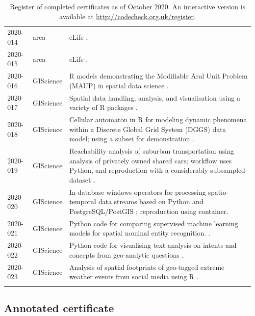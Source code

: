 \documentclass[12pt]{article}
\begin{document}
\begin{table}
\begin{tabular}{llp{11cm}}
    2020-014  \cite{cert-2020-014} & area & eLife \cite{Sadeh2020}. \\
    2020-015  \cite{cert-2020-015} & area & eLife \cite{Liou2020}. \\
    2020-016  \cite{cert-2020-016} & GIScience & 
    R models demonstrating the Modifiable Aral Unit Problem (MAUP) in spatial data science \cite{Brunsdon2020}. \\
    2020-017  \cite{cert-2020-017} & GIScience & 
    Spatial data handling, analysis, and visualisation using a variety of R packages \cite{Bivand2020}. \\
    2020-018  \cite{cert-2020-018} & GIScience & 
    Cellular automaton in R for modeling dynamic phenomena within a Discrete Global Grid System (DGGS) data model; using a subset for demonstration \cite{Hojati2020}. \\
    2020-019  \cite{cert-2020-019} & GIScience & Reachability analysis of suburban transportation using analysis of privately owned shared cars; workflow uses Python, and reproduction with a considerably subsampled dataset \cite{Illium2020}. \\
    2020-020  \cite{cert-2020-020} & GIScience & In-database windows operators for processing spatio-temporal data streams based on Python and PostgreSQL/PostGIS \cite{Werner2020}; reproduction using container. \\
    2020-021  \cite{cert-2020-021} & GIScience & Python code for comparing supervised machine learning models for spatial nominal entity recognition. \cite{Medad2020}. \\
    2020-022  \cite{cert-2020-022} & GIScience & Python code for visualising text analysis on intents and concepts from geo-analytic questions \cite{Xu2020}. \\
    2020-023  \cite{cert-2020-023} & GIScience & Analysis of spatial footprints of geo-tagged extreme weather events from social media using R \cite{Owuor2020}. \\
    \\ \bottomrule
  \end{tabular}
  \caption{Register of completed certificates as of October 2020.  An interactive version
  is available at \url{http://codecheck.org.uk/register}. %
  }
  \label{tab:register}
\end{table}

\subsection*{Annotated certificate}\label{annotated-certificate}
\end{document}
